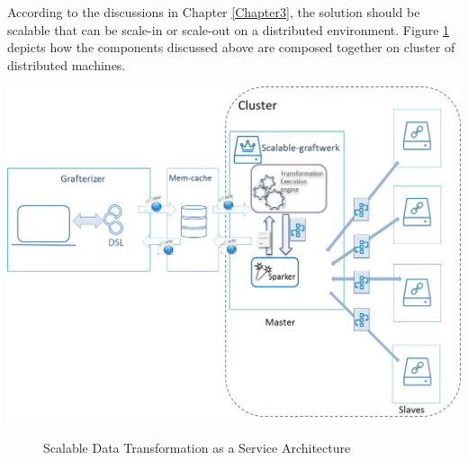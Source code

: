 According to the discussions in Chapter \ref{Chapter3}, the solution should be scalable that can be scale-in or scale-out on a distributed environment. Figure \ref{fig:architecture} depicts how the components discussed above are composed together on cluster of distributed machines. 
\begin{center}
	\includegraphics[width=38em]{./Figures/architecture}
	\begin{figure}[htbp]
    \caption{Scalable Data Transformation as a Service Architecture}
    \label{fig:architecture}
	\end{figure}
\end{center}
